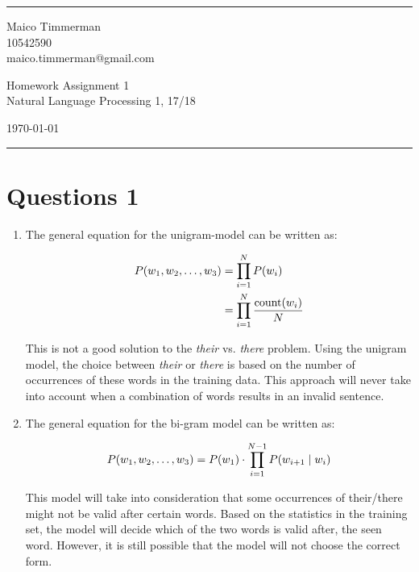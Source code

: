 \documentclass[a4paper]{article}
\begin{document}

\fancyhead[C]{}
\hrule \medskip %
\begin{minipage}{0.295\textwidth}
    \raggedright
    \footnotesize
    Maico Timmerman \hfill\\
    10542590\hfill\\
    maico.timmerman@gmail.com
\end{minipage}
\begin{minipage}{0.4\textwidth}
    \centering
    \large
    Homework Assignment 1\\
    \normalsize
    Natural Language Processing 1, 17/18\\
\end{minipage}
\begin{minipage}{0.295\textwidth}
    \raggedleft
    \today\hfill\\
\end{minipage}
\medskip\hrule
\bigskip


\section*{Questions 1}
\begin{enumerate}[label=(\alph*)]
    \item The general equation for the unigram-model can be written as:

        \begin{align}
            P(w_1, w_2, \ldots, w_3) &= \prod\limits_{i=1}^{N} P(w_i)\\
            &= \prod\limits_{i=1}^{N} \frac{\text{count}(w_i)}{N}\\
        \end{align}

        This is not a good solution to the \textit{their} vs. \textit{there}
        problem. Using the unigram model, the choice between \textit{their} or
        \textit{there} is based on the number of occurrences of these words in
        the training data. This approach will never take into account when a
        combination of words results in an invalid sentence.

    \item The general equation for the bi-gram model can be written as:

        \begin{align}
            P(w_1, w_2, \ldots, w_3) &= P(w_1)\cdot\prod\limits_{i=1}^{N-1} P(w_{i+1}
            \mid w_i)\\
        \end{align}

        This model will take into consideration that some occurrences of
        their/there might not be valid after certain words. Based on the
        statistics in the training set, the model will decide which of the two
        words is valid after, the seen word. However, it is still possible that
        the model will not choose the correct form.

\end{enumerate}
\end{document}
